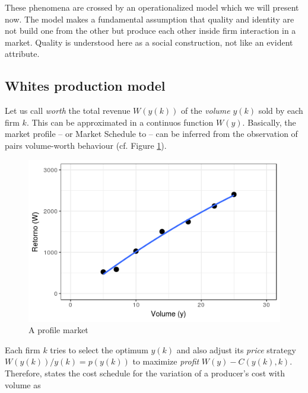 \documentclass[a4paper, 12pt, openright, oneside, german, french, brazil, english, article]{abntex2}
\begin{document}
	These phenomena are crossed by an operationalized model which we will present now. The model makes a fundamental assumption that quality and identity are not build one from the other but produce each other inside firm interaction in a market. Quality is understood here as a social construction, not like an evident attribute.
	
	\subsection{Whites production model}
	
	
	Let us call \textit{worth} the total revenue $W(y(k))$ of the \textit{volume} $y(k)$ sold by each firm $k$. This can be approximated in a continuos function $W(y)$. Basically, the market profile -- or Market Schedule to  -- can be inferred from the observation of pairs volume-worth behaviour (cf. Figure \ref{white_1.2}). 
	
	
	\begin{figure}[ht]
		\centering
		\caption{A profile market}
		\label{white_1.2}
		\includegraphics[scale=1]{white_1_2.png}
	\end{figure}
	
	Each firm $k$ tries to select the optimum $y(k)$ and also adjust its \textit{price} strategy 
	$ W(y(k))/y(k) = p(y(k)) $
	to maximize \textit{profit}
	$ W(y) - C(y(k), k) $. Therefore,  states the cost schedule for the variation of a producer's cost with volume as
	
\end{document}

